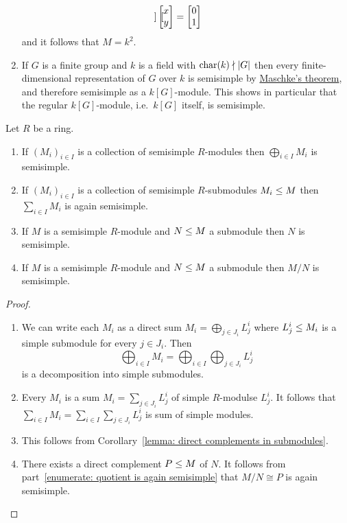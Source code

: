 \begin{example}
\begin{enumerate}
\begin{align*}
\begin{bmatrix}
            \end{bmatrix}
            \begin{bmatrix}x \\ y\end{bmatrix}
        &=  \begin{bmatrix}0 \\ 1\end{bmatrix}
      \end{align*}
      and it follows that $M = k^2$.
    \item
      If $G$ is a finite group and $k$ is a field with $\operatorname{char}(k) \nmid |G|$ then every finite-dimensional representation of $G$ over $k$ is semisimple by \hyperref[theorem: maschkes theorem]{Maschke’s theorem}, and therefore semisimple as a $k[G]$-module.
      This shows in particular that the regular $k[G]$-module, i.e.\ $k[G]$ itself, is semisimple.
  \end{enumerate}
\end{example}




\begin{lemma}
  \label{lemma: inherit semisimple}
  Let $R$ be a ring.
  \begin{enumerate}
    \item
      If $(M_i)_{i \in I}$ is a collection of semisimple $R$-modules then $\bigoplus_{i \in I} M_i$ is semisimple.
    \item
      If $(M_i)_{i \in I}$ is a collection of semisimple $R$-submodules $M_i \leq M$ then $\sum_{i \in I} M_i$ is again semisimple.
    \item
      If $M$ is a semisimple $R$-module and $N \leq M$ a submodule then $N$ is semisimple.
    \item
      \label{enumerate: quotient is again semisimple}
      If $M$ is a semisimple $R$-module and $N \leq M$ a submodule then $M/N$ is semisimple.
  \end{enumerate}
\end{lemma}


\begin{proof}
  \leavevmode
  \begin{enumerate}
    \item
      We can write each $M_i$ as a direct sum $M_i = \bigoplus_{j \in J_i} L^i_j$ where $L^i_j \leq M_i$ is a simple submodule for every $j \in J_i$.
      Then
      \[
          \bigoplus_{i \in I} M_i
        = \bigoplus_{i \in I} \bigoplus_{j \in J_i} L^i_j
      \]
      is a decomposition into simple submodules.
    \item
      Every $M_i$ is a sum $M_i = \sum_{j \in J_i} L^i_j$ of simple $R$-modulse $L^i_j$.
      It follows that $\sum_{i \in I} M_i = \sum_{i \in I} \sum_{j \in J_i} L^i_j$ is sum of simple modules.
    \item
      This follows from Corollary~\ref{lemma: direct complements in submodules}.
    \item
      There exists a direct complement $P \leq M$ of $N$.
      It follows from part~\ref*{enumerate: quotient is again semisimple} that $M/N \cong P$ is again semisimple.
    \qedhere
  \end{enumerate}
\end{proof}


